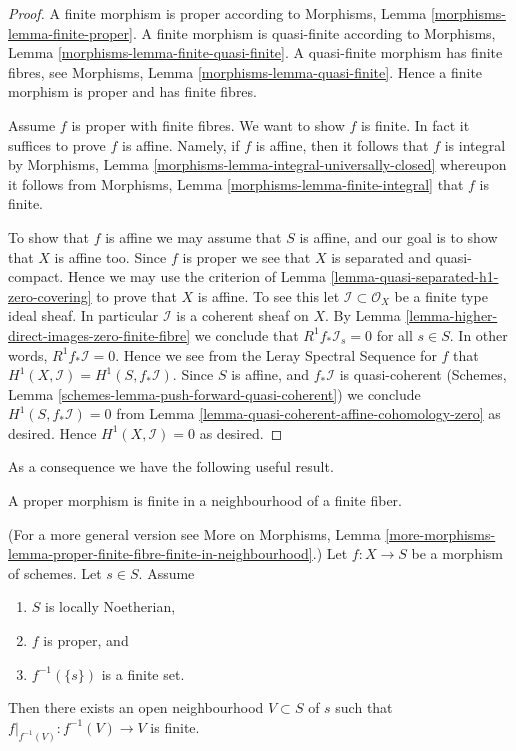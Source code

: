 \begin{proof}
A finite morphism is proper according to
Morphisms, Lemma \ref{morphisms-lemma-finite-proper}.
A finite morphism is quasi-finite according to
Morphisms, Lemma \ref{morphisms-lemma-finite-quasi-finite}.
A quasi-finite morphism has finite fibres, see
Morphisms, Lemma \ref{morphisms-lemma-quasi-finite}.
Hence a finite morphism is proper and has finite fibres.

\medskip\noindent
Assume $f$ is proper with finite fibres.
We want to show $f$ is finite.
In fact it suffices to prove $f$ is affine.
Namely, if $f$ is affine, then it follows that
$f$ is integral by
Morphisms, Lemma \ref{morphisms-lemma-integral-universally-closed}
whereupon it follows from
Morphisms, Lemma \ref{morphisms-lemma-finite-integral}
that $f$ is finite.

\medskip\noindent
To show that $f$ is affine we may assume that $S$ is affine, and our
goal is to show that $X$ is affine too.
Since $f$ is proper we see that $X$ is separated and quasi-compact.
Hence we may use the criterion of
Lemma \ref{lemma-quasi-separated-h1-zero-covering} to prove that $X$
is affine. To see this let $\mathcal{I} \subset \mathcal{O}_X$
be a finite type ideal sheaf. In particular $\mathcal{I}$ is
a coherent sheaf on $X$. By
Lemma \ref{lemma-higher-direct-images-zero-finite-fibre} we conclude that
$R^1f_*\mathcal{I}_s = 0$ for all $s \in S$.
In other words, $R^1f_*\mathcal{I} = 0$. Hence we see from
the Leray Spectral Sequence for $f$ that
$H^1(X , \mathcal{I}) = H^1(S, f_*\mathcal{I})$.
Since $S$ is affine, and $f_*\mathcal{I}$ is quasi-coherent
(Schemes, Lemma \ref{schemes-lemma-push-forward-quasi-coherent})
we conclude $H^1(S, f_*\mathcal{I}) = 0$
from Lemma \ref{lemma-quasi-coherent-affine-cohomology-zero}
as desired. Hence $H^1(X, \mathcal{I}) = 0$ as desired.
\end{proof}

\noindent
As a consequence we have the following useful result.

\begin{lemma}
\label{lemma-proper-finite-fibre-finite-in-neighbourhood}
\begin{slogan}
A proper morphism is finite in a neighbourhood of a finite fiber.
\end{slogan}
(For a more general version see
More on Morphisms,
Lemma \ref{more-morphisms-lemma-proper-finite-fibre-finite-in-neighbourhood}.)
Let $f : X \to S$ be a morphism of schemes.
Let $s \in S$.
Assume
\begin{enumerate}
\item $S$ is locally Noetherian,
\item $f$ is proper, and
\item $f^{-1}(\{s\})$ is a finite set.
\end{enumerate}
Then there exists an open neighbourhood $V \subset S$ of $s$
such that $f|_{f^{-1}(V)} : f^{-1}(V) \to V$ is finite.
\end{lemma}

